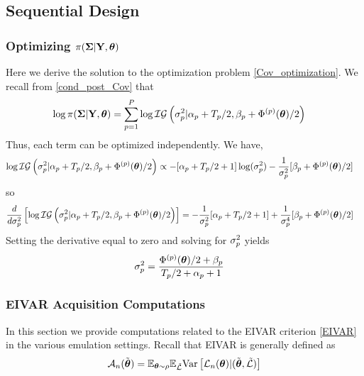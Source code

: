 \documentclass[12pt]{article}
\begin{document}
\subsection{Sequential Design}
\subsubsection{Optimizing $\pi(\boldsymbol{\Sigma}|\mathbf{Y}, \boldsymbol{\theta})$}
Here we derive the solution to the optimization problem \ref{Cov_optimization}. We recall from \ref{cond_post_Cov} that 
\begin{align*}
\log \pi(\boldsymbol{\Sigma}|\mathbf{Y}, \boldsymbol{\theta}) &= \sum_{p = 1}^{P} \log \mathcal{IG}\left(\sigma_{p}^2|\alpha_{p} + T_{p}/2, \beta_{p} + \Phi^{(p)}(\boldsymbol{\theta})/2 \right)
\end{align*}
Thus, each term can be optimized independently. We have, 
\begin{align*}
\log \mathcal{IG}\left(\sigma_{p}^2|\alpha_{p} + T_{p}/2, \beta_{p} + \Phi^{(p)}(\boldsymbol{\theta})/2 \right) &\propto -[\alpha_{p} + T_{p}/2 + 1]\log(\sigma^2_{p})
																									       - \frac{1}{\sigma^2_{p}} [\beta_{p} + \Phi^{(p)}(\boldsymbol{\theta})/2]
\end{align*}
so 
\begin{align*}
\frac{d}{d\sigma_{p}^2}\left[\log \mathcal{IG}\left(\sigma_{p}^2|\alpha_{p} + T_{p}/2, \beta_{p} + \Phi^{(p)}(\boldsymbol{\theta})/2 \right)\right] &= -\frac{1}{\sigma_{p}^2}[\alpha_{p} + T_{p}/2 + 1] + \frac{1}{\sigma_{p}^4} [\beta_{p} + \Phi^{(p)}(\boldsymbol{\theta})/2]
\end{align*}
Setting the derivative equal to zero and solving for $\sigma^2_{p}$ yields
\begin{align*}
\sigma_{p}^2 &= \frac{\Phi^{(p)}(\boldsymbol{\theta})/2 + \beta_{p}}{T_{p}/2 + \alpha_{p} + 1}
\end{align*}


\subsubsection{EIVAR Acquisition Computations}
In this section we provide computations related to the EIVAR criterion \ref{EIVAR} in the various emulation settings. Recall that EIVAR is generally defined as 
\begin{align*}
\mathcal{A}_{n}(\tilde{\boldsymbol{\theta}}) = \mathbb{E}_{\boldsymbol{\theta} \sim \rho} \mathbb{E}_{\tilde{\mathcal{L}}} \mathrm{Var}\left[\mathcal{L}_{n}(\boldsymbol{\theta}) | (\tilde{\boldsymbol{\theta}}, \tilde{\mathcal{L}}) \right] 
\end{align*}
\end{document}

